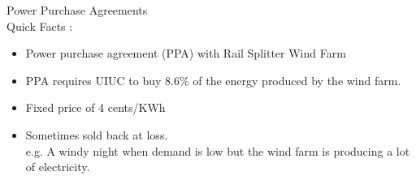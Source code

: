 \begin{frame}
\Large{Power Purchase Agreements}\\


Quick Facts \cite{breitweiser_wind_2016}:

\begin{itemize}
	\item Power purchase agreement (PPA) with Rail Splitter Wind Farm
	\item PPA requires UIUC to buy 8.6\% of the energy produced by the wind farm.
	\item Fixed price of 4 cents/KWh
	\item Sometimes sold back at loss.\\
	e.g. A windy night when demand is low but the wind farm is producing a lot of electricity.
\end{itemize}
	
\end{frame}